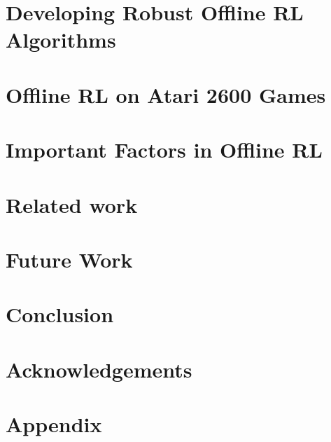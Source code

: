 \section{Developing Robust Offline RL Algorithms}


\vspace{-0.1cm}
\section{Offline RL on Atari 2600 Games}
\label{sec:offline_results}



\vspace{-0.1cm}
\section{Important Factors in Offline RL}
\label{sec:offline_factors}


\vspace{-0.15cm}
\section{Related work}


\vspace{-0.15cm}
\section{Future Work}


\vspace{-0.15cm}
\section{Conclusion}


\vspace{-0.15cm}
\section*{Acknowledgements}


\vspace{-0.15cm}
{\small }


\appendix
\cleardoublepage
{}
\section{Appendix}






